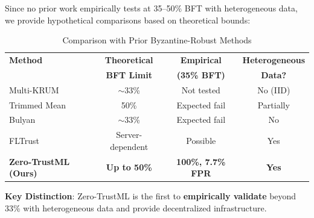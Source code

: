 Since no prior work empirically tests at 35--50\% BFT with heterogeneous data, we provide hypothetical comparisons based on theoretical bounds:

\begin{table}[h]
\centering
\caption{Comparison with Prior Byzantine-Robust Methods}
\label{tab:prior_work_comparison}
\begin{tabular}{@{}lccc@{}}
\toprule
\textbf{Method} & \textbf{Theoretical} & \textbf{Empirical} & \textbf{Heterogeneous} \\
 & \textbf{BFT Limit} & \textbf{(35\% BFT)} & \textbf{Data?} \\
\midrule
Multi-KRUM~\cite{blanchard2017machine} & $\sim$33\% & Not tested & No (IID) \\
Trimmed Mean~\cite{yin2018byzantine} & 50\% & Expected fail & Partially \\
Bulyan~\cite{mhamdi2018machine} & $\sim$33\% & Expected fail & No \\
FLTrust~\cite{cao2021fltrust} & Server-dependent & Possible & Yes \\
\textbf{Zero-TrustML (Ours)} & \textbf{Up to 50\%} & \textbf{100\%, 7.7\% FPR} & \textbf{Yes} \\
\bottomrule
\end{tabular}
\end{table}

\textbf{Key Distinction}: Zero-TrustML is the first to \textbf{empirically validate} beyond 33\% with heterogeneous data and provide decentralized infrastructure.

